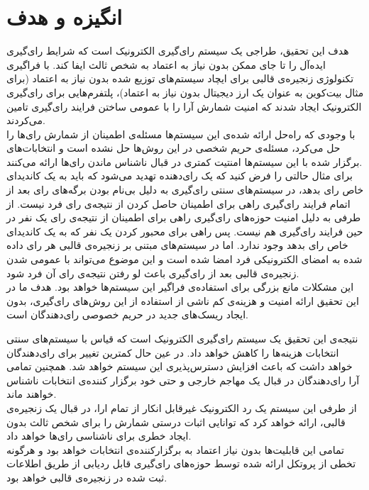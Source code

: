 \section{انگیزه و هدف}
هدف این تحقیق، طراجی یک سیستم رای‌گیری الکترونیک است که شرایط رای‌گیری ایده‌آل را تا جای ممکن بدون نیاز به اعتماد به شخص ثالث ایفا کند. با فراگیری تکنولوژی زنجیره‌ی قالبی برای ایچاد سیستم‌های توزیع شده بدون نیاز به اعتماد (برای مثال بیت‌کوین به عنوان یک‌ ارز دیجیتال بدون نیاز به اعتماد)، پلتفرم‌هایی برای رای‌گیری الکترونیک ایجاد شدند که امنیت شمارش آرا را با عمومی ساختن فرایند رای‌گیری تامین می‌کردند. 
\\
با وجودی که راه‌حل ارائه شده‌ی این سیستم‌ها مسئله‌ی اطمینان از شمارش رای‌ها را حل می‌کرد، مسئله‌ی حریم شخصی در این روش‌ها حل نشده است و انتخابات‌های برگزار شده با این سیستم‌ها امنتیت کمتری در قبال ناشناس ماندن رای‌ها ارائه می‌کنند. 
\\
برای مثال حالتی را فرض کنید که یک رای‌دهنده تهدید می‌شود که باید به یک کاندیدای خاص رای بدهد، در سیستم‌های سنتی رای‌گیری به دلیل بی‌نام بودن برگه‌های رای بعد از اتمام فرایند رای‌گیری راهی برای اطمینان حاصل کردن از نتیجه‌ی رای فرد نیست. از طرفی به دلیل امنیت حوزه‌های رای‌گیری راهی برای اطمینان از نتیجه‌ی رای یک نفر در حین فرایند رای‌گیری هم نیست. پس راهی برای محبور کردن یک نفر که به یک کاندیدای خاص رای بدهد وجود ندارد. اما در سیستم‌های مبتنی بر زنجیره‌ی قالبی هر رای داده شده به امضای الکترونیکی فرد امضا شده است و این موضوع می‌تواند با عمومی شدن زنجیره‌ی قالبی بعد از رای‌گیری باعث لو رفتن نتیجه‌ی رای آن فرد شود.
\\
این مشکلات مانع بزرگی برای استفاده‌ی فراگیر این سیستم‌ها خواهد بود. هدف ما در این تحقیق ارائه امنیت و هزینه‌ی کم ناشی از استفاده از این روش‌های رای‌گیری، بدون ایجاد ریسک‌های جدید در حریم خصوصی رای‌دهندگان است. 
\par
نتیجه‌ی این تحقیق یک سیستم‌ رای‌گیری الکترونیک است که قیاس با سیستم‌های سنتی انتخابات هزینه‌ها را کاهش خواهد داد. در عین حال کمترین تغییر برای رای‌دهندگان خواهد داشت که باعث افزایش دسترس‌پذیری این سیستم خواهد شد. همچنین تمامی آرا رای‌دهندگان در قبال یک مهاجم خارجی و حتی خود برگزار کننده‌ی انتخابات ناشناس خواهند ماند. 
\\
از طرفی این سیستم یک رد الکترونیک غیرقابل انکار از تمام ارا، در قبال یک زنجیره‌ی قالبی، ارائه ‌خواهد کرد که توانایی اثبات درستی شمارش را برای شخص ثالث بدون ایجاد خطری برای ناشناسی رای‌ها خواهد داد. 
\\
تمامی این قابلیت‌ها بدون نیاز اعتماد به برگزارکننده‌ی انتخابات خواهد بود و هرگونه تخطی از پروتکل ارائه شده توسط حوزه‌های رای‌گیری قابل ردیابی از طریق اطلاعات ثبت شده در زنجیره‌ی قالبی خواهد بود.








